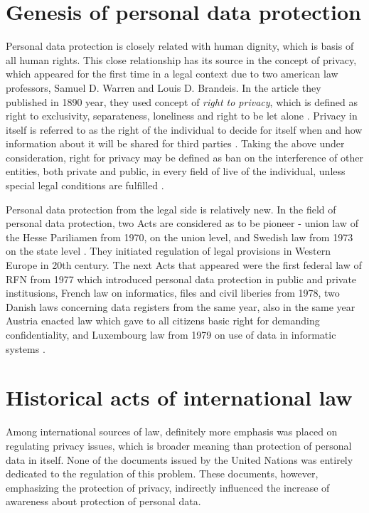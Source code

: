 \documentclass[en, noamssymb]{mgr}
\begin{document}
\section{Genesis of personal data protection}

Personal data protection is closely related with human dignity, which is basis of all human rights. This close relationship has its source in the concept of privacy, which appeared for the first time in a legal context due to two american law professors, Samuel D. Warren and Louis D. Brandeis. In the article they published in 1890 year, they used concept of \textit{right to privacy}, which is defined as right to exclusivity, separateness, loneliness and right to be let alone \cite{geneza_odo}. Privacy in itself is referred to as the right of the individual to decide for itself when and how information about it will be shared for third parties \cite{geneza_odo}. Taking the above under consideration, right for privacy may be defined as ban on the interference of other entities, both private and public, in every field of live of the individual, unless special legal conditions are fulfilled \cite{geneza_odo}.

\indent Personal data protection from the legal side is relatively new. In the field of personal data protection, two Acts are considered as to be pioneer - union law of the Hesse Pariliamen from 1970, on the union level, and Swedish law from 1973 on the state level \cite{prawo_odo}. They initiated regulation of legal provisions in Western Europe 
in 20th century. The next Acts that appeared were the first federal law of RFN from 1977  which introduced personal data protection in public and private institusions, French law on informatics, files and civil liberies from 1978, two Danish laws concerning data registers from the same year, also in the same year Austria enacted law which gave to all citizens basic right for demanding confidentiality, and Luxembourg law from 1979 on use of data in informatic systems \cite{prawo_odo}.



\section{Historical acts of international law}

\indent Among international sources of law, definitely more emphasis was placed on regulating privacy issues, which is broader meaning than protection of personal data in itself. None of the documents issued by the United Nations was entirely dedicated to the regulation of this problem. These documents, however, emphasizing the protection of privacy, indirectly influenced the increase of awareness about protection of personal data.
\end{document}

